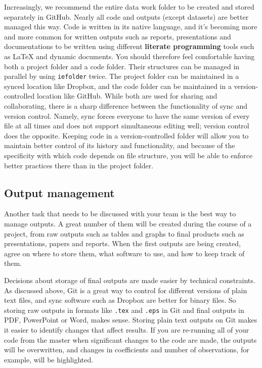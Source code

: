 Increasingly, we recommend the entire data work folder
to be created and stored separately in GitHub.
Nearly all code and outputs (except datasets) are better managed this way.
Code is written in its native language,
and it's becoming more and more common for written outputs such as reports,
presentations and documentations to be written using different \textbf{literate programming}
tools such as {\LaTeX} and dynamic documents.
You should therefore feel comfortable having both a project folder and a code folder.
Their structures can be managed in parallel by using \texttt{iefolder} twice.
The project folder can be maintained in a synced location like Dropbox,
and the code folder can be maintained in a version-controlled location like GitHub.
While both are used for sharing and collaborating,
there is a sharp difference between the functionality of sync and version control.
Namely, sync forces everyone to have the same version of every file at all times
and does not support simultaneous editing well; version control does the opposite.
Keeping code in a version-controlled folder will allow you
to maintain better control of its history and functionality,
and because of the specificity with which code depends on file structure,
you will be able to enforce better practices there than in the project folder.

\subsection{Output management}

Another task that needs to be discussed with your team is the best way to manage outputs.
A great number of them will be created during the course of a project,
from raw outputs such as tables and graphs to final products such as presentations, papers and reports.
When the first outputs are being created, agree on where to store them,
what software to use, and how to keep track of them.

Decisions about storage of final outputs are made easier by technical constraints.
As discussed above, Git is a great way to control for different versions of
plain text files, and sync software such as Dropbox are better for binary files.
So storing raw outputs in formats like \texttt{.tex} and \texttt{.eps} in Git and
final outputs in PDF, PowerPoint or Word, makes sense.
Storing plain text outputs on Git makes it easier to identify changes that affect results.
If you are re-running all of your code from the master when significant changes to the code are made,
the outputs will be overwritten, and changes in coefficients and number of observations, for example,
will be highlighted.

